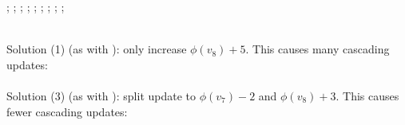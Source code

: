 {{        ;
        ;
        ;
        ;
        ;
        ;
        ;
        ;
        ;
    }

    \begin{center}
        \scalebox{\scale}{
            \begin{tikzpicture}
                \potgraph        
            \end{tikzpicture}
        }
        \bigskip \\
        {
        Solution (1) (as with \algdk): only increase $\phi(v_8) + 5$. This causes many cascading updates: \\
        }
        \smallskip 
        \bigskip \\
        {
        Solution (3) (as with \algbd): split update to $\phi(v_7) - 2$ and $\phi(v_8) + 3$. This causes fewer cascading updates: \\
        }
        \smallskip 
    \end{center}
}
